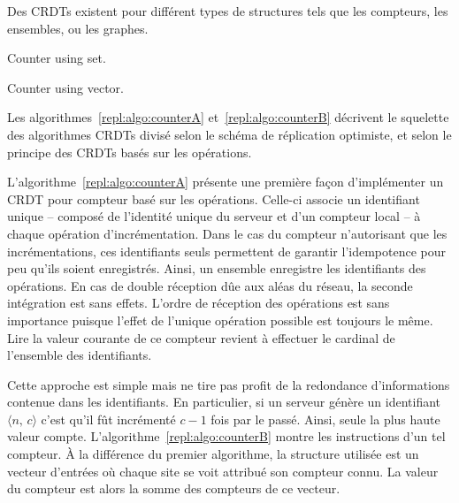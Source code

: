 Des CRDTs existent pour différent types de structures tels que les compteurs,
les ensembles, ou les graphes.\\
{\noindent%
\begin{minipage}[t]{0.48\textwidth}
  \begin{algorithm}[H]
    
    \caption{\label{repl:algo:counterA} Counter using set.}
  \end{algorithm}
\end{minipage}%
\hfill%
\begin{minipage}[t]{0.48\textwidth}
  \begin{algorithm}[H]
    
    \caption{\label{repl:algo:counterB} Counter using vector.}
  \end{algorithm}
\end{minipage}
}

Les algorithmes~\ref{repl:algo:counterA} et~\ref{repl:algo:counterB} décrivent
le squelette des algorithmes CRDTs divisé selon le schéma de réplication
optimiste, et selon le principe des CRDTs basés sur les opérations.

L'algorithme~\ref{repl:algo:counterA} présente une première façon d'implémenter
un CRDT pour compteur basé sur les opérations. Celle-ci associe un identifiant
unique -- composé de l'identité unique du serveur et d'un compteur local -- à
chaque opération d'incrémentation. Dans le cas du compteur n'autorisant que les
incrémentations, ces identifiants seuls permettent de garantir l'idempotence
pour peu qu'ils soient enregistrés. Ainsi, un ensemble enregistre les
identifiants des opérations. En cas de double réception dûe aux aléas du réseau,
la seconde intégration est sans effets. L'ordre de réception des opérations est
sans importance puisque l'effet de l'unique opération possible est toujours le
même. Lire la valeur courante de ce compteur revient à effectuer le cardinal de
l'ensemble des identifiants.

Cette approche est simple mais ne tire pas profit de la redondance
d'informations contenue dans les identifiants. En particulier, si un serveur
génère un identifiant $\langle n,\, c\rangle$ c'est qu'il fût incrémenté $c-1$
fois par le passé. Ainsi, seule la plus haute valeur
compte. L'algorithme~\ref{repl:algo:counterB} montre les instructions d'un tel
compteur. À la différence du premier algorithme, la structure utilisée est un
vecteur d'entrées où chaque site se voit attribué son compteur connu. La valeur
du compteur est alors la somme des compteurs de ce vecteur.

